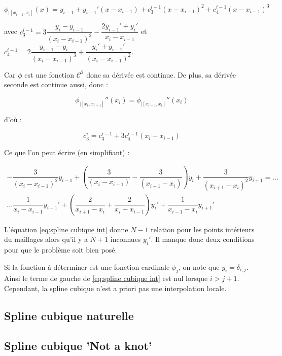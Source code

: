 \begin{equation}
\phi_{|[x_{i-1}, x_{i}]} (x) = y_{i-1} + y_{i-1}' (x-x_{i-1}) + c_3^{i-1} (x-x_{i-1})^2 + c_4^{i-1} (x-x_{i-1})^3
\end{equation}

avec $c_3^{i-1} = 3 \dfrac{y_i - y_{i-1}}{(x_{i}-x_{i-1})^2} - \dfrac{2 y_{i-1}' + y_{i}'}{x_{i}-x_{i-1}}$ et 
$c_4^{i-1} = 2 \dfrac{y_{i-1} - y_i}{(x_{i}-x_{i-1})^3} + \dfrac{y_{i}' + y_{i-1}'}{(x_{i}-x_{i-1})^2}$.

Car $\phi$ est une fonction $\mathcal{C}^2$ donc sa dérivée est continue. De plus, sa dérivée seconde est continue aussi, donc :

\begin{equation}
\phi_{|[x_i, x_{i+1}]}''(x_i) = \phi_{|[x_{i-1}, x_{i}]}''(x_i) 
\end{equation}

d'où :

\begin{equation}
c_3^i = c_3^{i-1} + 3 c_4^{i-1} ( x_i - x_{i-1} )
\end{equation}

Ce que l'on peut écrire (en simplifiant) :

\begin{multline}
- \dfrac{3}{(x_i - x_{i-1})^2} y_{i-1} + \left( \dfrac{3}{(x_i - x_{i-1})} - \dfrac{3}{(x_{i+1} - x_{i})} \right) y_i + \dfrac{3}{(x_{i+1} - x_{i})^2} y_{i+1} = ...\\
... \dfrac{1}{x_i - x_{i-1}} y_{i-1}' + \left( \dfrac{2}{x_{i+1}-x_i} + \dfrac{2}{x_{i}-x_{i-1}} \right)y_i' + \dfrac{1}{x_{i-1} - x_{i}} y_{i+1}' 
\label{eq:spline cubique int}
\end{multline}

L'équation \eqref{eq:spline cubique int} donne $N-1$ relation pour les points intérieurs du maillages alors qu'il y a $N+1$ inconnues $y_i'$. Il manque donc deux conditions pour que le problème soit bien posé.

Si la fonction à déterminer est une fonction cardinale $\phi_j$, on note que $y_i = \delta_{i,j}$. Ainsi le terme de gauche de \eqref{eq:spline cubique int} est nul lorsque $i>j+1$. Cependant, la spline cubique n'est a priori pas une interpolation locale.

\subsection{Spline cubique naturelle}

\subsection{Spline cubique 'Not a knot'}













